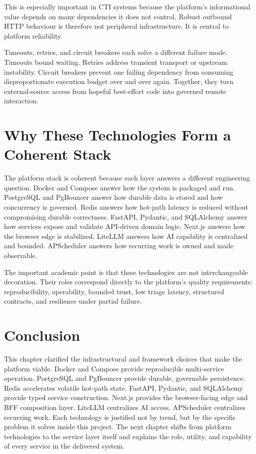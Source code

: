 This is especially important in CTI systems because the platform's informational value depends on many dependencies it does not control. Robust outbound HTTP behaviour is therefore not peripheral infrastructure. It is central to platform reliability.

Timeouts, retries, and circuit breakers each solve a different failure mode. Timeouts bound waiting. Retries address transient transport or upstream instability. Circuit breakers prevent one failing dependency from consuming disproportionate execution budget over and over again. Together, they turn external-source access from hopeful best-effort code into governed remote interaction.

\section{Why These Technologies Form a Coherent Stack}
The platform stack is coherent because each layer answers a different engineering question. Docker and Compose answer how the system is packaged and run. PostgreSQL and PgBouncer answer how durable data is stored and how concurrency is governed. Redis answers how hot-path latency is reduced without compromising durable correctness. FastAPI, Pydantic, and SQLAlchemy answer how services expose and validate API-driven domain logic. Next.js answers how the browser edge is stabilized. LiteLLM answers how AI capability is centralized and bounded. APScheduler answers how recurring work is owned and made observable.

The important academic point is that these technologies are not interchangeable decoration. Their roles correspond directly to the platform's quality requirements: reproducibility, operability, bounded trust, low triage latency, structured contracts, and resilience under partial failure.

\section*{Conclusion}
This chapter clarified the infrastructural and framework choices that make the platform viable. Docker and Compose provide reproducible multi-service operation. PostgreSQL and PgBouncer provide durable, governable persistence. Redis accelerates volatile hot-path state. FastAPI, Pydantic, and SQLAlchemy provide typed service construction. Next.js provides the browser-facing edge and BFF composition layer. LiteLLM centralizes AI access. APScheduler centralizes recurring work. Each technology is justified not by trend, but by the specific problem it solves inside this project. The next chapter shifts from platform technologies to the service layer itself and explains the role, utility, and capability of every service in the delivered system.
